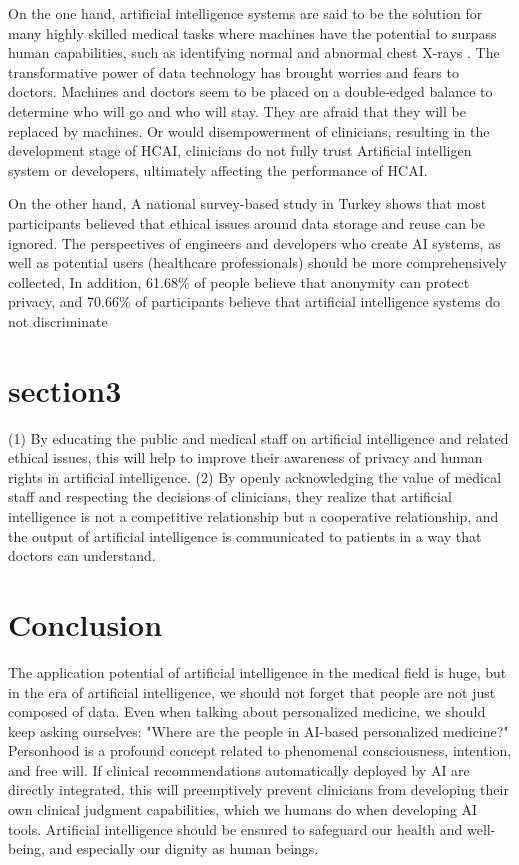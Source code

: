 \documentclass[paper=a4, fontsize=11pt]{scrartcl} %
\numberwithin{equation}{section} %
\numberwithin{figure}{section} %
\numberwithin{table}{section} %
\begin{document}
On the one hand, artificial intelligence systems are said to be the solution for many highly skilled medical tasks 
where machines have the potential to surpass human capabilities, such as identifying normal and abnormal chest X-rays \cite{iniestaHumanRoleGuarantee2023}.
The transformative power of data technology has brought worries and fears to doctors. Machines and 
doctors seem to be placed on a double-edged balance to determine who will go and who will stay. 
They are afraid that they will be replaced by machines.
Or would disempowerment of clinicians, resulting in the development stage of HCAI, 
clinicians do not fully trust Artificial intelligen system or developers, ultimately affecting the performance of HCAI.


On the other hand, A national survey-based study in Turkey shows that most participants believed that ethical issues around data storage 
and reuse can be ignored. The perspectives of engineers and developers who create AI systems, as well as potential users (healthcare professionals) 
should be more comprehensively collected, In addition, 61.68\% of people believe that anonymity can protect privacy, 
and 70.66\% of participants believe that artificial intelligence systems do not discriminate \cite{ahunPerceptionsConcernsEmergency2023}


\section{section3}
(1) By educating the public and medical staff on artificial intelligence and related ethical issues, this will help 
to improve their awareness of privacy and human rights in artificial intelligence.
(2) By openly acknowledging the value of medical staff and respecting the decisions of clinicians, they realize that 
artificial intelligence is not a competitive relationship but a cooperative relationship, and the output of artificial 
intelligence is communicated to patients in a way that doctors can understand.

\section{Conclusion}
The application potential of artificial intelligence in the medical field is huge, but in the era of artificial intelligence, 
we should not forget that people are not just composed of data. Even when talking about personalized medicine, we should keep 
asking ourselves: "Where are the people in AI-based personalized medicine?"
Personhood is a profound concept related to phenomenal consciousness, intention, and free will. If clinical recommendations 
automatically deployed by AI are directly integrated, this will preemptively prevent clinicians from developing their own clinical 
judgment capabilities, which we humans do when developing AI tools.
Artificial intelligence should be ensured to safeguard our health and well-being, and especially our dignity as human beings.
\end{document}
